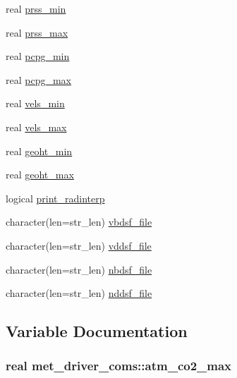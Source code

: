 \begin{DoxyCompactItemize}
\item 
real \hyperlink{namespacemet__driver__coms_a2ce8ae5dcf47b145fe6e4e73111f583a}{prss\+\_\+min}
\item 
real \hyperlink{namespacemet__driver__coms_ad1eb689e5f4208a3cb8c1565220b7f2f}{prss\+\_\+max}
\item 
real \hyperlink{namespacemet__driver__coms_ad1841d1a071652e80742e648d0eed3e8}{pcpg\+\_\+min}
\item 
real \hyperlink{namespacemet__driver__coms_adb27c5034caa99a0fcc4d3b42ef1d2e3}{pcpg\+\_\+max}
\item 
real \hyperlink{namespacemet__driver__coms_ac3d38fa5850b9e27104cf9949d2b5c15}{vels\+\_\+min}
\item 
real \hyperlink{namespacemet__driver__coms_a95bff007e6bff6167b2a89758d76fc2e}{vels\+\_\+max}
\item 
real \hyperlink{namespacemet__driver__coms_a2662a56fa4062bd473b19c649fa43b95}{geoht\+\_\+min}
\item 
real \hyperlink{namespacemet__driver__coms_aa1669f7b7ef87420b77b82855f067517}{geoht\+\_\+max}
\item 
logical \hyperlink{namespacemet__driver__coms_a12635d011e458fe5603d8af326faa956}{print\+\_\+radinterp}
\item 
character(len=str\+\_\+len) \hyperlink{namespacemet__driver__coms_a5077cb97033c5b4e610edbe044ce890e}{vbdsf\+\_\+file}
\item 
character(len=str\+\_\+len) \hyperlink{namespacemet__driver__coms_aeb25a3a4ea0b2fd649a7bab6b694d8be}{vddsf\+\_\+file}
\item 
character(len=str\+\_\+len) \hyperlink{namespacemet__driver__coms_a8f3d2674e75157c654a61aa253ba5ac7}{nbdsf\+\_\+file}
\item 
character(len=str\+\_\+len) \hyperlink{namespacemet__driver__coms_a8adb3cddd748a6ba29fb75dd69ca54c7}{nddsf\+\_\+file}
\end{DoxyCompactItemize}


\subsection{Variable Documentation}
\hypertarget{namespacemet__driver__coms_aec2e25a82647949db4d9bbaafb62220c}{}
\subsubsection[{atm\+\_\+co2\+\_\+max}]{\setlength{\rightskip}{0pt plus 5cm}real met\+\_\+driver\+\_\+coms\+::atm\+\_\+co2\+\_\+max}\label{namespacemet__driver__coms_aec2e25a82647949db4d9bbaafb62220c}
\hypertarget{namespacemet__driver__coms_ae3e4146e8ca9281e8ba30db39ece0e43}{}
